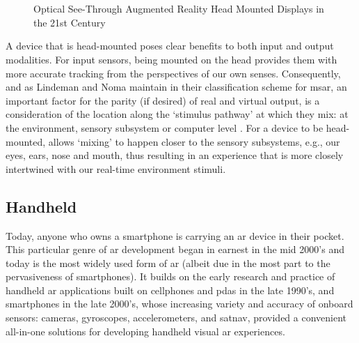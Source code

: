 \begin{figure}
    \centering
    \captionsetup{justification=centering}
    \quad
    \hfill
    \\
    \vspace{0.5cm}
    \quad
    \hfill
    \\
    \caption{Optical See-Through Augmented Reality Head Mounted Displays in the 21st Century}
    \label{fig: contemporaryHMDs}
\end{figure}

A device that is head-mounted poses clear benefits to both input and output modalities. For input sensors, being mounted on the head provides them with more accurate tracking from the perspectives of our own senses. Consequently, and as Lindeman and Noma maintain in their classification scheme for \gls{msar}, an important factor for the parity (if desired) of real and virtual output, is a consideration of the location along the `stimulus pathway' at which they mix: at the environment, sensory subsystem or computer level \citeyearpar{lindeman2007}. For a device to be head-mounted, allows `mixing' to happen closer to the sensory subsystems, e.g., our eyes, ears, nose and mouth, thus resulting in an experience that is more closely intertwined with our real-time environment stimuli.

\subsection{Handheld}\label{sec: ar-forms-mobile}
Today, anyone who owns a smartphone is carrying an \gls{ar} device in their pocket. This particular genre of \gls{ar} development began in earnest in the mid 2000's and today is the most widely used form of \gls{ar} (albeit due in the most part to the pervasiveness of smartphones). It builds on the early research and practice of handheld \gls{ar} applications built on cellphones and \glspl{pda} in the late 1990's, and smartphones in the late 2000's, whose increasing variety and accuracy of onboard sensors: cameras, gyroscopes, accelerometers, and \gls{satnav}, provided a convenient all-in-one solutions for developing handheld visual \gls{ar} experiences. 

